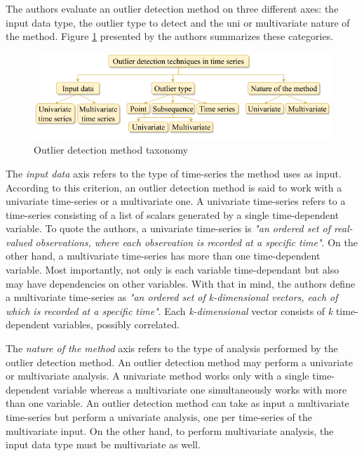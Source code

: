 The authors evaluate an outlier detection method on three different axes: the input data type, the outlier type to detect and the uni or multivariate nature of the method. Figure \ref{fig:outlier-taxonomy} presented by the authors summarizes these categories.

\begin{figure}[!htb]
  \begin{center}
    \includegraphics[scale=0.55]{figures/outlier-method-taxonomy.png}
    \caption{Outlier detection method taxonomy}
    \label{fig:outlier-taxonomy}
  \end{center}
\end{figure}

The \textit{input data} axis refers to the type of time-series the method uses as input. According to this criterion, an outlier detection method is said to work with a univariate time-series or a multivariate one. A univariate time-series refers to a time-series consisting of a list of scalars generated by a single time-dependent variable. To quote the authors, a univariate time-series is \textit{"an ordered set of real-valued observations, where each observation is recorded at a specific time"}. On the other hand, a multivariate time-series has more than one time-dependent variable. Most importantly, not only is each variable time-dependant but also may have dependencies on other variables. With that in mind, the authors define a multivariate time-series as \textit{"an ordered set of k-dimensional vectors, each of which is recorded at a specific time"}. Each \textit{k-dimensional} vector consists of \textit{k}  time-dependent variables, possibly correlated.

The \textit{nature of the method} axis refers to the type of analysis performed by the outlier detection method. An outlier detection method may perform a univariate or multivariate analysis. A univariate method works only with a single time-dependent variable whereas a multivariate one simultaneously works with more than one variable. An outlier detection method can take as input a multivariate time-series but perform a univariate analysis, one per time-series of the multivariate input. On the other hand, to perform multivariate analysis, the input data type must be multivariate as well.

